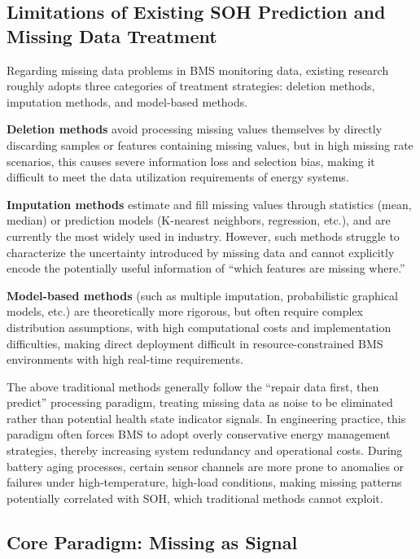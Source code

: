 \documentclass[10pt,a4paper]{article}
\begin{document}
\subsection{Limitations of Existing SOH Prediction and Missing Data Treatment}

Regarding missing data problems in BMS monitoring data, existing research roughly adopts three categories of treatment strategies: deletion methods, imputation methods, and model-based methods.

\textbf{Deletion methods} avoid processing missing values themselves by directly discarding samples or features containing missing values, but in high missing rate scenarios, this causes severe information loss and selection bias, making it difficult to meet the data utilization requirements of energy systems.

\textbf{Imputation methods} estimate and fill missing values through statistics (mean, median) or prediction models (K-nearest neighbors, regression, etc.), and are currently the most widely used in industry. However, such methods struggle to characterize the uncertainty introduced by missing data and cannot explicitly encode the potentially useful information of ``which features are missing where.''

\textbf{Model-based methods} (such as multiple imputation, probabilistic graphical models, etc.) are theoretically more rigorous, but often require complex distribution assumptions, with high computational costs and implementation difficulties, making direct deployment difficult in resource-constrained BMS environments with high real-time requirements.

The above traditional methods generally follow the ``repair data first, then predict'' processing paradigm, treating missing data as noise to be eliminated rather than potential health state indicator signals. In engineering practice, this paradigm often forces BMS to adopt overly conservative energy management strategies, thereby increasing system redundancy and operational costs. During battery aging processes, certain sensor channels are more prone to anomalies or failures under high-temperature, high-load conditions, making missing patterns potentially correlated with SOH, which traditional methods cannot exploit.

\subsection{Core Paradigm: Missing as Signal}
\end{document}
